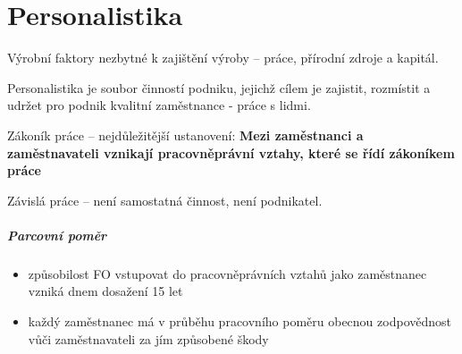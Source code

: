 \chapter{Personalistika}

Výrobní faktory nezbytné k zajištění výroby -- práce, přírodní zdroje a kapitál.

Personalistika je soubor činností podniku, jejichž cílem je zajistit, rozmístit a udržet pro podnik kvalitní zaměstnance - práce s lidmi.

Zákoník práce -- nejdůležitější ustanovení: \textbf{Mezi zaměstnanci a zaměstnavateli vznikají pracovněprávní vztahy, které se řídí zákoníkem práce}

Závislá práce -- není samostatná činnost, není podnikatel.

\paragraph*{Parcovní poměr}
\begin{itemize}
    \item způsobilost FO vstupovat do pracovněprávních vztahů jako zaměstnanec vzniká dnem dosažení 15 let
    \item každý zaměstnanec má v průběhu pracovního poměru obecnou zodpovědnost vůči zaměstnavateli za jím způsobené škody
\end{itemize}

